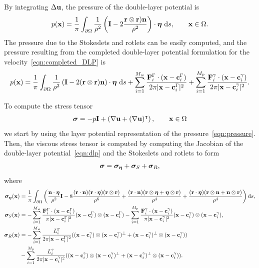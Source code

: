 \documentclass[preprint, 10pt]{elsarticle}
\begin{document}
 By
integrating $\Delta {\mathbf{u}}$, the pressure of the double-layer potential is \cite{Power1993}
\begin{align*}
  p({\mathbf{x}}) = \frac{1}{\pi}\int_{\partial\Omega}\frac{1}{\rho^2}\left(
\mathbf{I} - 2\frac{{\mathbf{r}} \otimes {\mathbf{r}}){\mathbf{n}}}{\rho^2}\right)\cdot{\boldsymbol\eta}~\text{d}s,
\qquad{\mathbf{x}}\in\Omega.
\end{align*}
The pressure due to the Stokeslets and rotlets can be easily computed,
and the pressure resulting from the completed double-layer potential
formulation for the velocity~\eqref{eqn:completed_DLP} is
\begin{align}
  \label{eqn:pressure} 
  p({\mathbf{x}}) = \frac{1}{\pi}\int_{\partial\Omega}\frac{1}{\rho^2}\left(
    \mathbf{I} - 2({\mathbf{r}} \otimes {\mathbf{r}}){\mathbf{n}}\right)\cdot{\boldsymbol\eta}~\text{d}s +
  \sum_{i=1}^{M_w}
  \frac{{\mathbf{F}}_i^\Gamma\cdot({\mathbf{x}}-{\mathbf{c}}_i^\Gamma)}{2\pi|{\mathbf{x}}-{\mathbf{c}}_i^{\Gamma}|^2}
  + \sum_{i=1}^{M_p}
    \frac{{\mathbf{F}}_i^\gamma\cdot({\mathbf{x}}-{\mathbf{c}}_i^\gamma)}{2\pi|{\mathbf{x}}-{\mathbf{c}}_i^\gamma|^2}.
\end{align}

To compute the stress tensor
\begin{align*} 
{\boldsymbol\sigma} = -p \mathbf{I} + \left(\nabla {\mathbf{u}} + (\nabla{\mathbf{u}})^\intercal\right), \qquad
{\mathbf{x}}\in\Omega
\end{align*}
we start by using the layer potential representation of the
pressure~\eqref{eqn:pressure}.  Then, the viscous stress tensor is
computed by computing the Jacobian of the double-layer
potential~\eqref{eqn:dlp} and the Stokeslets and rotlets to form
\begin{align}
  \label{eqn:stress}
  {\boldsymbol\sigma} = {\boldsymbol\sigma}_{{\boldsymbol\eta}} + {\boldsymbol\sigma}_{S} + {\boldsymbol\sigma}_{R},
\end{align}
where
\begin{align*}
  {\boldsymbol\sigma}_{{\boldsymbol\eta}}({\mathbf{x}}) &= \frac{1}{\pi}\int_{\partial\Omega}\left( 
    \frac{{\mathbf{n}}\cdot{\boldsymbol\eta}}{\rho^2}\mathbf{I} 
    -8\frac{({\mathbf{r}}\cdot{\mathbf{n}})({\mathbf{r}}\cdot{\boldsymbol\eta})({\mathbf{r}}\otimes{\mathbf{r}})}{\rho^6} 
    +\frac{({\mathbf{r}}\cdot{\mathbf{n}})({\mathbf{r}}\otimes{\boldsymbol\eta} + {\boldsymbol\eta}\otimes{\mathbf{r}})}{\rho^4} 
+ \frac{({\mathbf{r}}\cdot{\boldsymbol\eta})({\mathbf{r}}\otimes{\mathbf{n}} +
{\mathbf{n}}\otimes{\mathbf{r}})}{\rho^4}\right)\text{d}s,\\
  {\boldsymbol\sigma}_S({\mathbf{x}}) &= -\sum_{i=1}^{M_w} 
    \frac{{\mathbf{F}}_i^\Gamma\cdot({\mathbf{x}} - {\mathbf{c}}_i^\Gamma)}{\pi|{\mathbf{x}}-{\mathbf{c}}_i^\Gamma|^2}
        ({\mathbf{x}} - {\mathbf{c}}_i^\Gamma)\otimes({\mathbf{x}} - {\mathbf{c}}_i^\Gamma)  -
    \sum_{i=1}^{M_p}
    \frac{{\mathbf{F}}_i^\gamma\cdot({\mathbf{x}} - {\mathbf{c}}_i^\gamma)}{\pi|{\mathbf{x}}-{\mathbf{c}}_i^\gamma|^2}
        ({\mathbf{x}}-{\mathbf{c}}_i^\gamma )\otimes({\mathbf{x}}-{\mathbf{c}}_i^\gamma),\\
{\boldsymbol\sigma}_R({\mathbf{x}}) &= -\sum_{i=1}^{M_w} \frac{L_i^\Gamma}{2\pi|{\mathbf{x}}-{\mathbf{c}}_i^\Gamma|^2}
(({\mathbf{x}}-{\mathbf{c}}_i^\gamma)\otimes({\mathbf{x}}-{\mathbf{c}}_i^\gamma)^\perp +
    ({\mathbf{x}}-{\mathbf{c}}_i^\gamma)^\perp\otimes({\mathbf{x}}-{\mathbf{c}}_i^\gamma))  \\
\qquad&-\sum_{i=1}^{M_p}
\frac{L_i^\gamma}{2\pi|{\mathbf{x}}-{\mathbf{c}}_i^\gamma|^2}
    (({\mathbf{x}}-{\mathbf{c}}_i^\gamma )\otimes({\mathbf{x}}-{\mathbf{c}}_i^\gamma)^\perp + 
    ({\mathbf{x}}-{\mathbf{c}}_i^\gamma)^\perp\otimes({\mathbf{x}}-{\mathbf{c}}_i^\gamma)).
\end{align*}
\end{document}
